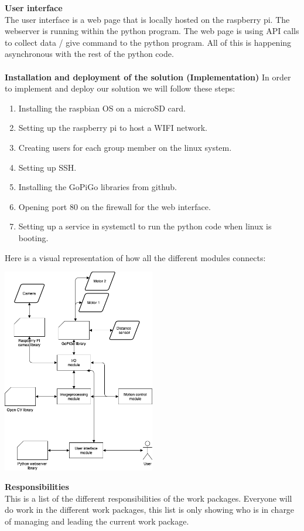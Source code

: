 \documentclass[11pt]{article}
\begin{document}
\textbf{User interface} 
\\
The user interface is a web page that is locally hosted on the raspberry pi. The webserver is running within the python program. The web page is using API calls to collect data / give command to the python program. All of this is happening asynchronous with the rest of the python code. 
\\\\
\textbf{Installation and deployment of the solution (Implementation)}
In order to implement and deploy our solution we will follow these steps:
\begin{enumerate}
    \item Installing the raspbian OS on a microSD card. 
    \item Setting up the raspberry pi to host a WIFI network. 
    \item Creating users for each group member on the linux system.
    \item Setting up SSH. 
    \item Installing the GoPiGo libraries from github. 
    \item Opening port 80 on the firewall for the web interface. 
    \item Setting up a service in systemctl to run the python code when linux is booting.
\end{enumerate}
Here is a visual representation of how all the different modules connects: 
\begin{center}
    \includegraphics[width=0.5\textwidth]{flowdiagram}
\end{center}
\textbf{Responsibilities} \\
This is a list of the different responsibilities of the work packages. Everyone will do work in the different work packages, this list is only showing who is in charge of managing and leading the current work package. \\\\
\end{document}
